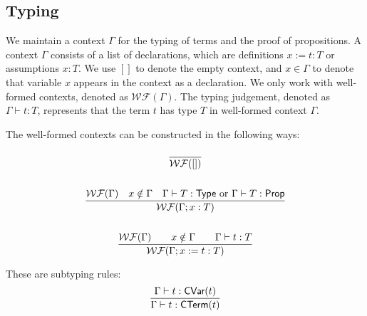 \subsection{Typing}

\newcommand{\WF}[1]{\ensuremath{\mathcal{WF}(#1)}}

We maintain a context $\Gamma$ for the typing of terms and the proof of propositions. 
A context $\Gamma$ consists of a list of declarations, which are definitions $x := t : T$ or assumptions $x : T$. 
We use $[]$ to denote the empty context, and $x \in \Gamma$ to denote that variable $x$ appears in the context as a declaration.
We only work with well-formed contexts, denoted as \WF{\Gamma}. 
The typing judgement, denoted as $\Gamma \vdash t : T$, represents that the term $t$ has type $T$ in well-formed context $\Gamma$. 


The well-formed contexts can be constructed in the following ways:

\begin{gather*}
    \frac{}{\WF{[]}} \\
    \\
    \frac{\WF{\Gamma} \quad x \notin \Gamma \quad \Gamma \vdash T : \Type \text{ or } \Gamma \vdash T : \prop}{\WF{\Gamma;x:T}} \\
    \\
    \frac{\WF{\Gamma} \qquad x \notin \Gamma \qquad \Gamma \vdash t : T}{\WF{\Gamma;x := t : T}} \\
\end{gather*}

These are subtyping rules:
\begin{gather*}
    \frac{\Gamma \vdash t : \textsf{CVar}(t)}{\Gamma \vdash t : \textsf{CTerm}(t)}
\end{gather*}


